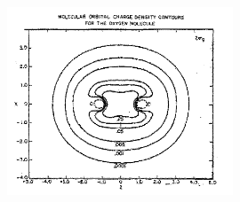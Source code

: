 \documentclass[11pt]{memoir}
\begin{document}
\begin{figure}
\begin{center}
\includegraphics[width=0.6\textwidth]{images/mulliken_figure1.png}
\end{center}


\end{figure}
\end{document}
